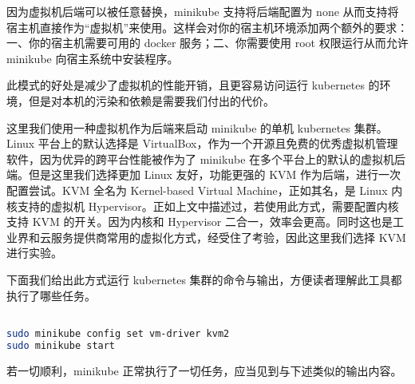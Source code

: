 因为虚拟机后端可以被任意替换，minikube 支持将后端配置为 none 从而支持将宿主机直接作为“虚拟机”来使用。这样会对你的宿主机环境添加两个额外的要求：一、你的宿主机需要可用的 docker 服务；二、你需要使用 root 权限运行从而允许 minikube 向宿主系统中安装程序。

此模式的好处是减少了虚拟机的性能开销，且更容易访问运行 kubernetes 的环境，但是对本机的污染和依赖是需要我们付出的代价。


这里我们使用一种虚拟机作为后端来启动 minikube 的单机 kubernetes 集群。Linux 平台上的默认选择是 VirtualBox，作为一个开源且免费的优秀虚拟机管理软件，因为优异的跨平台性能被作为了 minikube 在多个平台上的默认的虚拟机后端。但是这里我们选择更加 Linux 友好，功能更强的 KVM 作为后端，进行一次配置尝试。KVM 全名为 Kernel-based Virtual Machine，正如其名，是 Linux 内核支持的虚拟机 Hypervisor。正如上文中描述过，若使用此方式，需要配置内核支持 KVM 的开关。因为内核和 Hypervisor 二合一，效率会更高。同时这也是工业界和云服务提供商常用的虚拟化方式，经受住了考验，因此这里我们选择 KVM 进行实验。

下面我们给出此方式运行 kubernetes 集群的命令与输出，方便读者理解此工具都执行了哪些任务。

\begin{lstlisting}[language=bash]

sudo minikube config set vm-driver kvm2
sudo minikube start

\end{lstlisting}

若一切顺利，minikube 正常执行了一切任务，应当见到与下述类似的输出内容。

